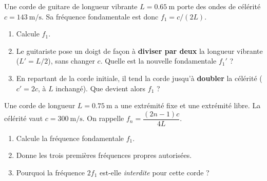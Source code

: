 \documentclass[11pt,a4paper]{article}
\begin{document}
\begin{exo}
Une corde de guitare de longueur vibrante $L=\SI{0.65}{\metre}$ porte des ondes de célérité
$c=\SI{143}{\metre\per\second}$. Sa fréquence fondamentale est donc $f_1=c/(2L)$.
\begin{enumerate}[label=\alph*)]
  \item Calcule $f_1$.
  \item Le guitariste pose un doigt de façon à \textbf{diviser par deux} la longueur vibrante
        ($L'=L/2$), sans changer $c$. Quelle est la nouvelle fondamentale $f_1'$ ?
  \item En repartant de la corde initiale, il tend la corde jusqu'à \textbf{doubler} la
        célérité ($c'=2c$, à $L$ inchangé). Que devient alors $f_1$ ?
\end{enumerate}
\end{exo}

\begin{exo}
Une corde de longueur $L=\SI{0.75}{\metre}$ a une extrémité fixe et une extrémité libre. La
célérité vaut $c=\SI{300}{\metre\per\second}$. On rappelle $f_n=\dfrac{(2n-1)c}{4L}$.
\begin{enumerate}[label=\alph*)]
  \item Calcule la fréquence fondamentale $f_1$.
  \item Donne les trois premières fréquences propres autorisées.
  \item Pourquoi la fréquence $2f_1$ est-elle \emph{interdite} pour cette corde ?
\end{enumerate}
\end{exo}
\end{document}
